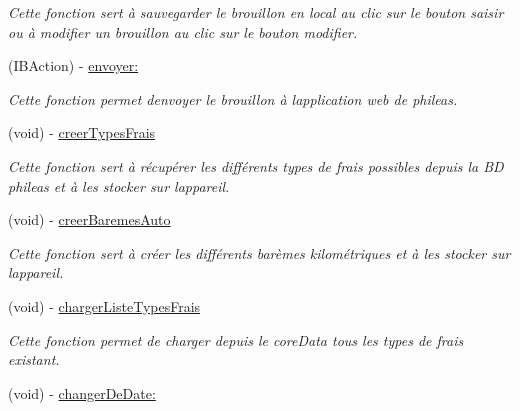 \begin{DoxyCompactItemize}
\begin{DoxyCompactList}\small\item\em Cette fonction sert à sauvegarder le brouillon en local au clic sur le bouton saisir ou à modifier un brouillon au clic sur le bouton modifier. \end{DoxyCompactList}\item 
(I\+B\+Action) -\/ \hyperlink{interface_frais_table_view_controller_abc98906544c206fd4e0d95985c5311e6}{envoyer\+:}
\begin{DoxyCompactList}\small\item\em Cette fonction permet d\textquotesingle{}envoyer le brouillon à l\textquotesingle{}application web de phileas. \end{DoxyCompactList}\item 
(void) -\/ \hyperlink{interface_frais_table_view_controller_ad99824daa7ac44e459ef385c4cac69ef}{creer\+Types\+Frais}
\begin{DoxyCompactList}\small\item\em Cette fonction sert à récupérer les différents types de frais possibles depuis la B\+D phileas et à les stocker sur l\textquotesingle{}appareil. \end{DoxyCompactList}\item 
(void) -\/ \hyperlink{interface_frais_table_view_controller_a2f40e61c1e197bfefc2d6d7482255ac7}{creer\+Baremes\+Auto}
\begin{DoxyCompactList}\small\item\em Cette fonction sert à créer les différents barèmes kilométriques et à les stocker sur l\textquotesingle{}appareil. \end{DoxyCompactList}\item 
\hypertarget{interface_frais_table_view_controller_acc1bac7eaa03824cda75c83d1e2eed5c}{}(void) -\/ \hyperlink{interface_frais_table_view_controller_acc1bac7eaa03824cda75c83d1e2eed5c}{charger\+Liste\+Types\+Frais}\label{interface_frais_table_view_controller_acc1bac7eaa03824cda75c83d1e2eed5c}

\begin{DoxyCompactList}\small\item\em Cette fonction permet de charger depuis le core\+Data tous les types de frais existant. \end{DoxyCompactList}\item 
\hypertarget{interface_frais_table_view_controller_a153c4b8a9c89021c55e531528e8551d2}{}(void) -\/ \hyperlink{interface_frais_table_view_controller_a153c4b8a9c89021c55e531528e8551d2}{changer\+De\+Date\+:}\label{interface_frais_table_view_controller_a153c4b8a9c89021c55e531528e8551d2}


\end{DoxyCompactItemize}
